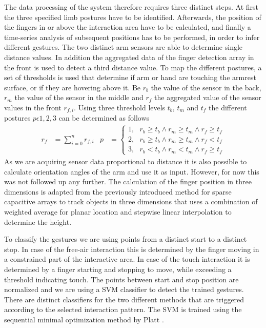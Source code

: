 The data processing of the system therefore requires three distinct steps. At first the three specified limb postures have to be identified. Afterwards, the position of the fingers in or above the interaction area have to be calculated, and finally a time-series analysis of subsequent positions has to be performed, in order to infer different gestures. The two distinct arm sensors are able to determine single distance values. In addition the aggregated data of the finger detection array in the front is used to detect a third distance value. To map the different postures, a set of thresholds is used that determine if arm or hand are touching the armrest surface, or if they are hovering above it. Be $r_b$ the value of the sensor in the back, $r_m$ the value of the sensor in the middle and $r_f$ the aggregated value of the sensor values in the front $r_{f,i}$. Using three threshold levels $t_b$, $t_m$ and $t_f$ the different postures $p\epsilon{1,2,3}$ can be determined as follows
\begin{align}
r_f&=\sum^n_{i=0}{r_{f,i}} & p&=\left\{ \begin{array}{c}
1,\ \ \ r_b\ge t_b \wedge r_m\ge t_m \wedge r_f\ge t_f\\ 
2,\ \ \ r_b\ge t_b \wedge r_m\ge t_m \wedge r_f< t_f \\ 
3,\ \ \ r_b< t_b \wedge r_m< t_m \wedge r_f\ge t_f \end{array}
\right.
\end{align}
As we are acquiring sensor data proportional to distance it is also possible to calculate orientation angles of the arm and use it as input. However, for now this was not followed up any further.
The calculation of the finger position in three dimensions is adapted from the previously introduced method for sparse capacitive arrays to track objects in three dimensions that uses a combination of weighted average for planar location and stepwise linear interpolation to determine the height. 

To classify the gestures we are using points from a distinct start to a distinct stop. In case of the free-air interaction this is determined by the finger moving in a constrained part of the interactive area. In case of the touch interaction it is determined  by a finger starting and stopping to move, while exceeding a threshold indicating touch. The points between start and stop position are normalized and we are using a SVM classifier to detect the trained gestures. There are distinct classifiers for the two different methods that are triggered according to the selected interaction pattern. The SVM is trained using the sequential minimal optimization method by Platt \cite{platt1999fast}.

